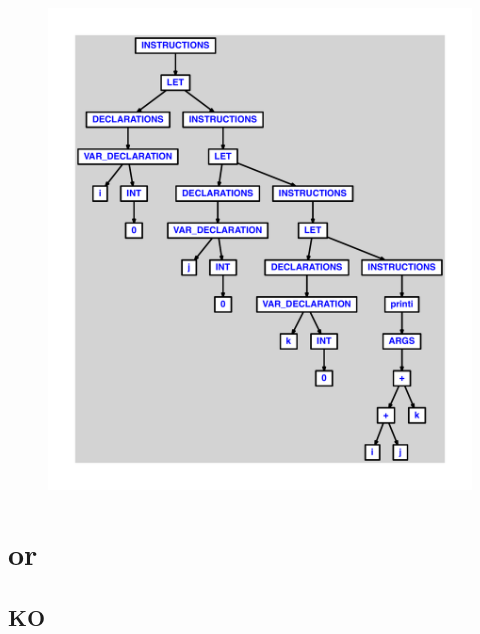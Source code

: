 \documentclass{article}
\begin{document}
\begin{figure}[H]\centering\includegraphics[max width=\textwidth]{ast/ast_271.pdf}\end{figure}\section{or}
\subsection{KO}
\end{document}
